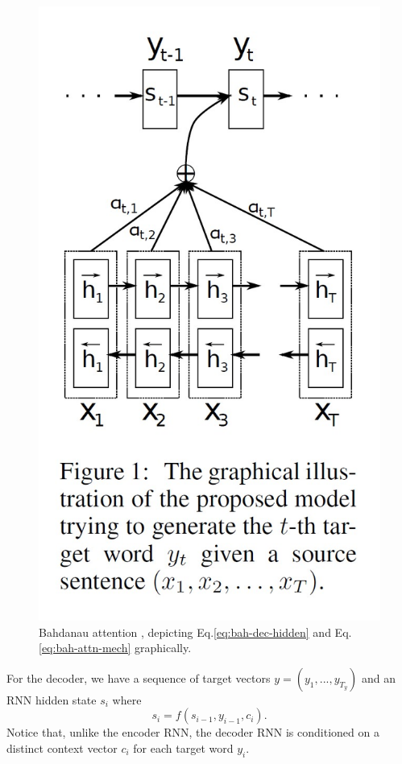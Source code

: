 \documentclass[11pt]{article}
\numberwithin{equation}{section}
\begin{document}
\begin{figure}
\begin{center}
\includegraphics[width=0.4\columnwidth]{../figures/enc-dec-attn.jpg}  
\end{center}
\caption{Bahdanau attention \citep{bahdanau14}, depicting Eq.\eqref{eq:bah-dec-hidden} and Eq.\eqref{eq:bah-attn-mech} graphically.}
\label{fig:bah-attn}
\end{figure}

For the decoder, we have a sequence of target vectors $y=(y_1,...,y_{T_y})$ and an RNN hidden state $s_i$ where
\begin{equation}
s_i = f(s_{i-1}, y_{i-1}, c_i). \label{eq:bah-dec-hidden}
\end{equation}
Notice that, unlike the encoder RNN, the decoder RNN is conditioned on a distinct context vector $c_i$ for each target word $y_i$.
\end{document}
